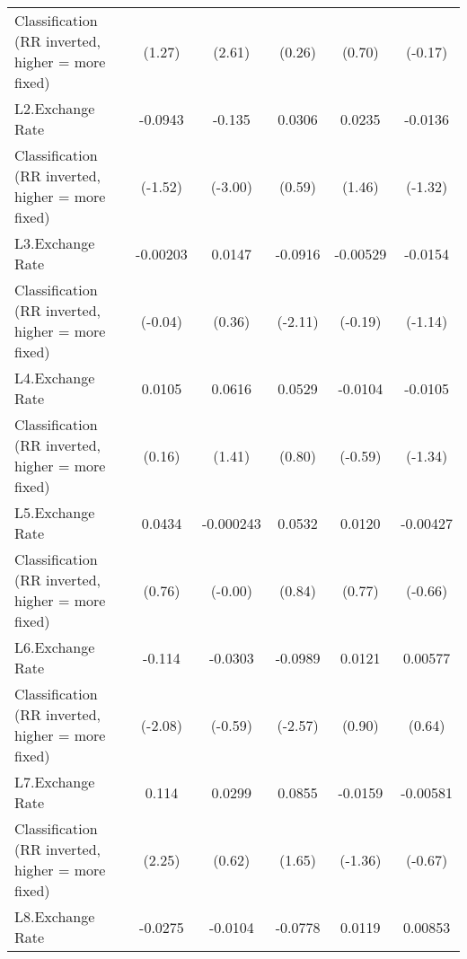 {\begin{tabular}{l*{5}{c}}
Classification (RR inverted, higher = more fixed)&      (1.27)         &      (2.61)         &      (0.26)         &      (0.70)         &     (-0.17)         \\
[1em]
L2.Exchange Rate    &     -0.0943         &      -0.135\sym{**} &      0.0306         &      0.0235         &     -0.0136         \\
Classification (RR inverted, higher = more fixed)&     (-1.52)         &     (-3.00)         &      (0.59)         &      (1.46)         &     (-1.32)         \\
[1em]
L3.Exchange Rate    &    -0.00203         &      0.0147         &     -0.0916\sym{*}  &    -0.00529         &     -0.0154         \\
Classification (RR inverted, higher = more fixed)&     (-0.04)         &      (0.36)         &     (-2.11)         &     (-0.19)         &     (-1.14)         \\
[1em]
L4.Exchange Rate    &      0.0105         &      0.0616         &      0.0529         &     -0.0104         &     -0.0105         \\
Classification (RR inverted, higher = more fixed)&      (0.16)         &      (1.41)         &      (0.80)         &     (-0.59)         &     (-1.34)         \\
[1em]
L5.Exchange Rate    &      0.0434         &   -0.000243         &      0.0532         &      0.0120         &    -0.00427         \\
Classification (RR inverted, higher = more fixed)&      (0.76)         &     (-0.00)         &      (0.84)         &      (0.77)         &     (-0.66)         \\
[1em]
L6.Exchange Rate    &      -0.114\sym{*}  &     -0.0303         &     -0.0989\sym{*}  &      0.0121         &     0.00577         \\
Classification (RR inverted, higher = more fixed)&     (-2.08)         &     (-0.59)         &     (-2.57)         &      (0.90)         &      (0.64)         \\
[1em]
L7.Exchange Rate    &       0.114\sym{*}  &      0.0299         &      0.0855         &     -0.0159         &    -0.00581         \\
Classification (RR inverted, higher = more fixed)&      (2.25)         &      (0.62)         &      (1.65)         &     (-1.36)         &     (-0.67)         \\
[1em]
L8.Exchange Rate    &     -0.0275         &     -0.0104         &     -0.0778         &      0.0119         &     0.00853         \\

\end{tabular}}
